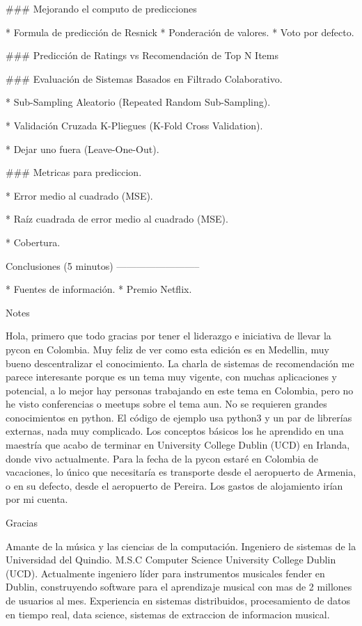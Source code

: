 ### Mejorando el computo de predicciones

* Formula de predicción de Resnick
* Ponderación de valores.
* Voto por defecto.

### Predicción de Ratings vs Recomendación de Top N Items


### Evaluación de Sistemas Basados en Filtrado Colaborativo.

* Sub-Sampling Aleatorio (Repeated Random Sub-Sampling).

* Validación Cruzada K-Pliegues (K-Fold Cross Validation).

* Dejar uno fuera (Leave-One-Out).

### Metricas para prediccion.

* Error medio al cuadrado (MSE).

* Raíz cuadrada de error medio al cuadrado (MSE).

* Cobertura.


Conclusiones (5 minutos)
--------------------------

* Fuentes de información.
* Premio Netflix.





Notes

Hola, primero que todo gracias por tener el liderazgo e iniciativa de llevar la pycon en Colombia.
Muy feliz de ver como esta edición es en Medellin, muy bueno descentralizar el conocimiento.
La charla de sistemas de recomendación me parece interesante porque es un tema muy vigente, con muchas
aplicaciones y potencial, a lo mejor hay personas trabajando en este tema en Colombia, pero no he visto
conferencias o meetups sobre el tema aun.
No se requieren grandes conocimientos en python. El código de ejemplo usa python3 y un par de librerías
externas, nada muy complicado.
Los conceptos básicos los he aprendido en una maestría que acabo de terminar en University College Dublin (UCD)
en Irlanda, donde vivo actualmente. Para la fecha de la pycon estaré en Colombia de vacaciones, lo único que
necesitaría es transporte desde el aeropuerto de Armenia, o en su defecto, desde el aeropuerto de Pereira.
Los gastos de alojamiento irían por mi cuenta.

Gracias



Amante de la música y las ciencias de la computación. Ingeniero de sistemas de la Universidad del Quindio.
M.S.C Computer Science University College Dublin (UCD). Actualmente ingeniero líder para instrumentos
musicales fender en Dublin, construyendo software para el aprendizaje musical con mas de 2 millones de
usuarios al mes. Experiencia en sistemas distribuidos, procesamiento de datos en tiempo real, data science,
sistemas de extraccion de informacion musical.
